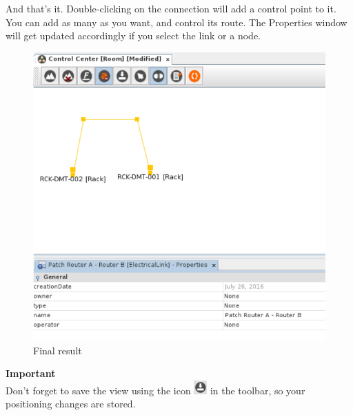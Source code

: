 \documentclass[a4paper]{article}
\begin{document}
			And that's it. Double-clicking on the connection will add a control point to it. You can add as many as you want, and control its route. The Properties window will get updated accordingly if you select the link or a node.
			\begin{figure}[h!]
				\centering
				\includegraphics[width=0.6\linewidth]{img/l1_example_1_final.png}
				\caption{Final result}
				\label{fig:l1_example_1_final}
			\end{figure}
			\begin{framed} {\large \textbf{Important}}\\
				Don't forget to save the view using the icon \includegraphics[width=0.5cm]{img/icon_save.png} in the toolbar, so your positioning changes are stored.
			\end{framed}
			
\end{document}
